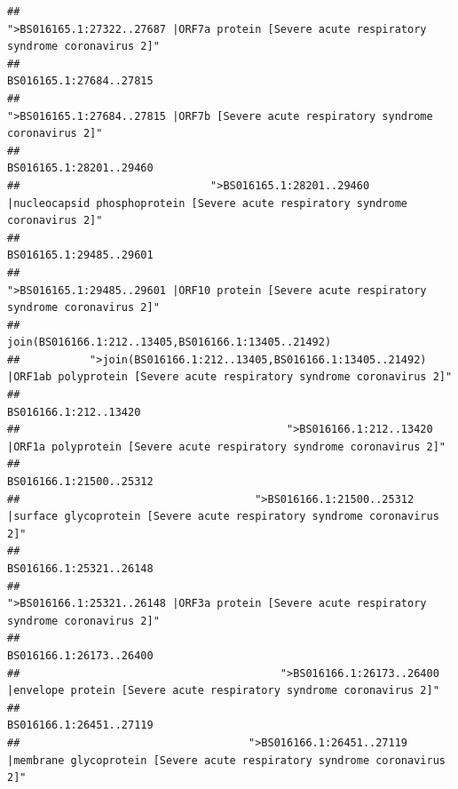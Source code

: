 \documentclass[
]{article}
\begin{document}
\begin{verbatim}
##                                            ">BS016165.1:27322..27687 |ORF7a protein [Severe acute respiratory syndrome coronavirus 2]" 
##                                                                                                                BS016165.1:27684..27815 
##                                                    ">BS016165.1:27684..27815 |ORF7b [Severe acute respiratory syndrome coronavirus 2]" 
##                                                                                                                BS016165.1:28201..29460 
##                              ">BS016165.1:28201..29460 |nucleocapsid phosphoprotein [Severe acute respiratory syndrome coronavirus 2]" 
##                                                                                                                BS016165.1:29485..29601 
##                                            ">BS016165.1:29485..29601 |ORF10 protein [Severe acute respiratory syndrome coronavirus 2]" 
##                                                                                    join(BS016166.1:212..13405,BS016166.1:13405..21492) 
##           ">join(BS016166.1:212..13405,BS016166.1:13405..21492) |ORF1ab polyprotein [Severe acute respiratory syndrome coronavirus 2]" 
##                                                                                                                  BS016166.1:212..13420 
##                                          ">BS016166.1:212..13420 |ORF1a polyprotein [Severe acute respiratory syndrome coronavirus 2]" 
##                                                                                                                BS016166.1:21500..25312 
##                                     ">BS016166.1:21500..25312 |surface glycoprotein [Severe acute respiratory syndrome coronavirus 2]" 
##                                                                                                                BS016166.1:25321..26148 
##                                            ">BS016166.1:25321..26148 |ORF3a protein [Severe acute respiratory syndrome coronavirus 2]" 
##                                                                                                                BS016166.1:26173..26400 
##                                         ">BS016166.1:26173..26400 |envelope protein [Severe acute respiratory syndrome coronavirus 2]" 
##                                                                                                                BS016166.1:26451..27119 
##                                    ">BS016166.1:26451..27119 |membrane glycoprotein [Severe acute respiratory syndrome coronavirus 2]" 

\end{verbatim}
\end{document}

